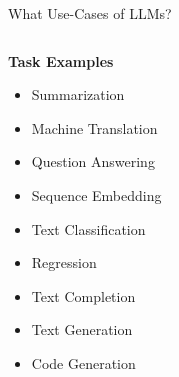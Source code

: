 \documentclass[11pt,aspectratio=169]{beamer}
\begin{document}
\begin{frame}{What Use-Cases of LLMs?}
\begin{columns}
        \begin{column}{0.3\linewidth}
            \begin{center}
            \textbf{Task Examples}
            \end{center}
            \begin{itemize}
                \item Summarization
                \item Machine Translation
                \item Question Answering
            \end{itemize}
            \vspace{0.3cm}
            \begin{itemize}
                \item Sequence Embedding
                \item Text Classification
                \item Regression
            \end{itemize}
            \vspace{0.3cm}
            \begin{itemize}
                \item Text Completion
                \item Text Generation
                \item Code Generation
            \end{itemize}
        \end{column}


\end{columns}
\end{frame}
\end{document}
